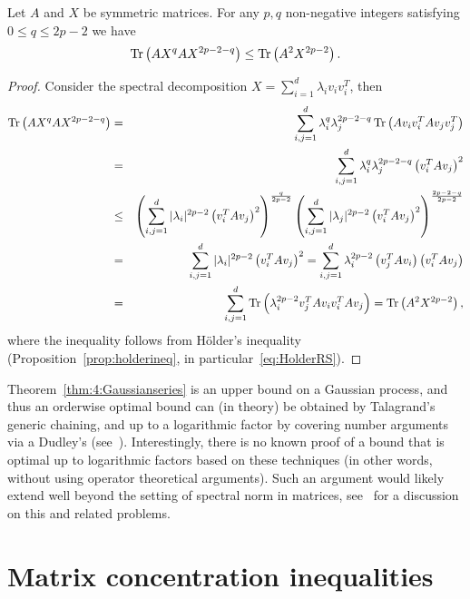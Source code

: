 \begin{lemma}\label{lemma:commutativeisworstGIbP}
Let $A$ and $X$ be symmetric matrices. For any $p,q$ non-negative integers satisfying $0\leq q \leq 2p-2$ we have
\[
\operatorname{Tr}\left(AX^qAX^{2p-2-q}\right) \leq \operatorname{Tr}\left(A^2X^{2p-2}\right).
\] 
\end{lemma}

\begin{proof}
Consider the spectral decomposition $X = \sum_{i=1}^d \lambda_i v_iv_i^T$, then
\begin{eqnarray*}
\operatorname{Tr}\left(AX^qAX^{2p-2-q}\right) & = & \sum_{i,j=1}^d\lambda_i^q\lambda_j^{2p-2-q}\operatorname{Tr}\left(Av_iv_i^TAv_jv_j^T\right) \\
& = & \sum_{i,j=1}^d\lambda_i^q\lambda_j^{2p-2-q}\left(v_i^TAv_j\right)^2 \\
& \leq & \left( \sum_{i,j=1}^d|\lambda_i|^{2p-2}\left(v_i^TAv_j\right)^2 \right)^{\frac{q}{2p-2}} \left( \sum_{i,j=1}^d|\lambda_j|^{2p-2}\left(v_i^TAv_j\right)^2 \right)^{\frac{2p-2-q}{2p-2}}\\
& = & \sum_{i,j=1}^d|\lambda_i|^{2p-2}\left(v_i^TAv_j\right)^2 =  \sum_{i,j=1}^d\lambda_i^{2p-2}\left(v_j^TAv_i\right)\left(v_i^TAv_j\right) \\
& = & \sum_{i,j=1}^d\operatorname{Tr}\left(\lambda_i^{2p-2}v_j^TAv_iv_i^TAv_j\right) = \operatorname{Tr}\left(A^2X^{2p-2}\right),
\end{eqnarray*}
where the inequality follows from H\"older's inequality (Proposition~\ref{prop:holderineq}, in particular~\eqref{eq:HolderRS}).
\end{proof}




\begin{remark}
Theorem~\ref{thm:4:Gaussianseries} is an upper bound on a Gaussian process, and thus an orderwise optimal bound can (in theory) be obtained by Talagrand's generic chaining, and up to a logarithmic factor by covering number arguments via a Dudley's (see~\cite{Talagrand14}). Interestingly, there is no known proof of a bound that is optimal up to logarithmic factors based on these techniques (in other words, without using operator theoretical arguments). Such an argument would likely extend well beyond the setting of spectral norm in matrices, see~\cite{Lucca-et-al-TensorNCK} for a discussion on this and related problems.
\end{remark}

\section{Matrix concentration inequalities}

